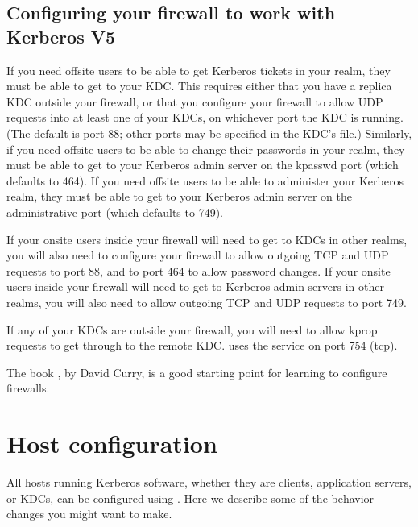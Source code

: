 \documentclass[letterpaper,10pt,english]{sphinxmanual}
\begin{document}
\section{Configuring your firewall to work with Kerberos V5}
\label{\detokenize{admin/appl_servers:configuring-your-firewall-to-work-with-kerberos-v5}}\label{\detokenize{admin/appl_servers:conf-firewall}}
\sphinxAtStartPar
If you need off\sphinxhyphen{}site users to be able to get Kerberos tickets in your
realm, they must be able to get to your KDC.  This requires either
that you have a replica KDC outside your firewall, or that you
configure your firewall to allow UDP requests into at least one of
your KDCs, on whichever port the KDC is running.  (The default is port
88; other ports may be specified in the KDC’s {\hyperref[\detokenize{admin/conf_files/kdc_conf:kdc-conf-5}]{}}
file.)  Similarly, if you need off\sphinxhyphen{}site users to be able to change
their passwords in your realm, they must be able to get to your
Kerberos admin server on the kpasswd port (which defaults to 464).  If
you need off\sphinxhyphen{}site users to be able to administer your Kerberos realm,
they must be able to get to your Kerberos admin server on the
administrative port (which defaults to 749).

\sphinxAtStartPar
If your on\sphinxhyphen{}site users inside your firewall will need to get to KDCs in
other realms, you will also need to configure your firewall to allow
outgoing TCP and UDP requests to port 88, and to port 464 to allow
password changes.  If your on\sphinxhyphen{}site users inside your firewall will
need to get to Kerberos admin servers in other realms, you will also
need to allow outgoing TCP and UDP requests to port 749.

\sphinxAtStartPar
If any of your KDCs are outside your firewall, you will need to allow
kprop requests to get through to the remote KDC.  {\hyperref[\detokenize{admin/admin_commands/kprop:kprop-8}]{}} uses
the  service on port 754 (tcp).

\sphinxAtStartPar
The book , by David Curry, is a good starting
point for learning to configure firewalls.


\chapter{Host configuration}
\label{\detokenize{admin/host_config:host-configuration}}\label{\detokenize{admin/host_config::doc}}
\sphinxAtStartPar
All hosts running Kerberos software, whether they are clients,
application servers, or KDCs, can be configured using
{\hyperref[\detokenize{admin/conf_files/krb5_conf:krb5-conf-5}]{}}.  Here we describe some of the behavior changes
you might want to make.
\end{document}
